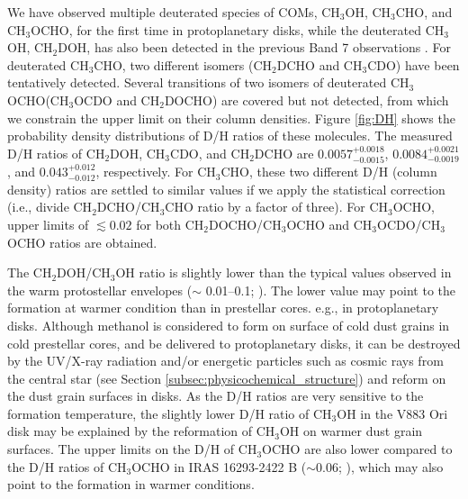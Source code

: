 \documentclass[linenumbers, twocolumn, twocolappendix, astrosymb, times]{aastex631}
\newcommand{\methanol}{CH$_3$OH\xspace}
\newcommand{\acetaldehyde}{CH$_3$CHO\xspace}
\newcommand{\methylformate}{CH$_3$OCHO\xspace}
\begin{document}
We have observed multiple deuterated species of COMs, \methanol, \acetaldehyde, and \methylformate, for the first time in protoplanetary disks, while the deuterated \methanol, CH$_2$DOH, has also been detected in the previous Band 7 observations \citep{Lee2019}. For deuterated \acetaldehyde, two different isomers (CH$_2$DCHO and CH$_3$CDO) have been tentatively detected. Several transitions of two isomers of deuterated \methylformate (CH$_3$OCDO and CH$_2$DOCHO) are covered but not detected, from which we constrain the upper limit on their column densities. Figure \ref{fig:DH} shows the probability density distributions of D/H ratios of these molecules. The measured D/H ratios of CH$_2$DOH, CH$_3$CDO, and CH$_2$DCHO are $0.0057_{-0.0015}^{+0.0018}$, $0.0084_{-0.0019}^{+0.0021}$, and $0.043_{-0.012}^{+0.012}$, respectively. For \acetaldehyde, these two different D/H (column density) ratios are settled to similar values if we apply the statistical correction (i.e., divide CH$_2$DCHO/\acetaldehyde ratio by a factor of three). For \methylformate, upper limits of $\lesssim0.02$ for both CH$_2$DOCHO/\methylformate and CH$_3$OCDO/\methylformate ratios are obtained.


The CH$_2$DOH/\methanol ratio is slightly lower than the typical values observed in the warm protostellar envelopes ($\sim$ 0.01--0.1; \citealt{Drozdovskaya2021}).  The lower value may point to the formation at warmer condition than in prestellar cores. e.g., in protoplanetary disks. Although methanol is considered to form on surface of cold dust grains in cold prestellar cores, and be delivered to protoplanetary disks, it can be destroyed by the UV/X-ray radiation and/or energetic particles such as cosmic rays from the central star (see Section \ref{subsec:physicochemical_structure}) and reform on the dust grain surfaces in disks. As the D/H ratios are very sensitive to the formation temperature, the slightly lower D/H ratio of \methanol in the V883 Ori disk may be explained by the reformation of \methanol on warmer dust grain surfaces. The upper limits on the D/H of \methylformate are also lower compared to the D/H ratios of \methylformate in IRAS 16293-2422 B ($\sim0.06$; \citealt{Jorgensen2018}), which may also point to the formation in warmer conditions.
\end{document}
